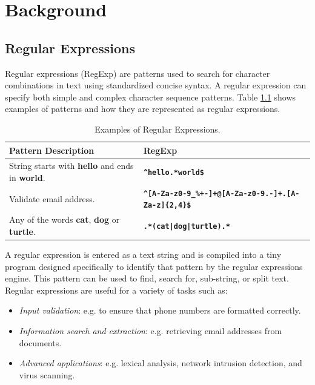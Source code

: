 \chapter{Background}\label{chapter:background}

\section{Regular Expressions}
Regular expressions (RegExp) are patterns used to search for character combinations in text using standardized concise syntax. A regular expression can specify both simple and complex character sequence patterns.  Table \ref{tab:regexsamp} shows examples of patterns and how they are represented as regular expressions.

{\renewcommand{\arraystretch}{1.6}%
\begin{table}[H]
\centering
\begin{adjustbox}{width=1.1\textwidth,center=\textwidth}
\small
\begin{tabular}{|l|l|}
\hline
Pattern Description       & RegExp  \\
\hline
String starts with \textbf{hello} and ends in \textbf{world}. & \texttt{\textbf{\^{}hello.*world\$}} \\
\hline
Validate email address. & \texttt{\textbf{\^{}[A-Za-z0-9\_\%+-]+@[A-Za-z0-9.-]+.[A-Za-z]\{2,4\}\$}} \\
\hline
Any of the words \textbf{cat}, \textbf{dog} or \textbf{turtle}. & \texttt{\textbf{.*(cat|dog|turtle).*}}\\
\hline
\end{tabular}
\end{adjustbox}
\caption{Examples of Regular Expressions.}\label{tab:regexsamp}
\end{table}}

A regular expression is entered as a text string and is compiled into a tiny program designed specifically to identify that pattern by the regular expressions engine. This pattern can be used to find, search for, sub-string, or split text. Regular expressions are useful for a variety of tasks such as:
 \begin{itemize}
     \item \textit{Input validation}: e.g. to ensure that phone numbers are formatted correctly.
     \item \textit{Information search and extraction}: e.g. retrieving email addresses from documents. \item \textit{Advanced applications}: e.g. lexical analysis, network intrusion detection, and virus scanning.
 \end{itemize}

